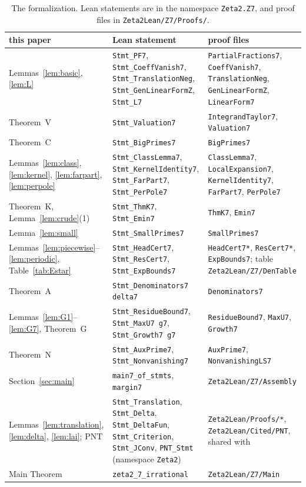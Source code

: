 \documentclass{amsart}
\theoremstyle{definition}
\theoremstyle{remark}
\numberwithin{equation}{section}
\begin{document}
\begin{table}[ht]
\centering
\footnotesize
\setlength{\tabcolsep}{3pt}
\renewcommand{\arraystretch}{1.2}
\caption{The formalization. Lean statements are in the namespace
\texttt{Zeta2.Z7}, and proof files in \texttt{Zeta2Lean/Z7/Proofs/}.}\label{tab:formal}
\begin{tabular}{P{2.9cm}P{4.4cm}P{4.3cm}}
\hline
this paper & Lean statement & proof files\\
\hline
Lemmas~\ref{lem:basic}, \ref{lem:L} & \texttt{Stmt\_PF7}, \texttt{Stmt\_CoeffVanish7},
  \texttt{Stmt\_TranslationNeg}, \texttt{Stmt\_GenLinearFormZ}, \texttt{Stmt\_L7}
 & \texttt{PartialFractions7}, \texttt{CoeffVanish7}, \texttt{TranslationNeg},
   \texttt{GenLinearFormZ}, \texttt{LinearForm7}\\
Theorem~V & \texttt{Stmt\_Valuation7} & \texttt{IntegrandTaylor7}, \texttt{Valuation7}\\
Theorem~C & \texttt{Stmt\_BigPrimes7} & \texttt{BigPrimes7}\\
Lemmas~\ref{lem:class}, \ref{lem:kernel}, \ref{lem:farpart}, \ref{lem:perpole}
 & \texttt{Stmt\_ClassLemma7}, \texttt{Stmt\_KernelIdentity7},
   \texttt{Stmt\_FarPart7}, \texttt{Stmt\_PerPole7}
 & \texttt{ClassLemma7}, \texttt{LocalExpansion7}, \texttt{KernelIdentity7},
   \texttt{FarPart7}, \texttt{PerPole7}\\
Theorem~K, Lemma~\ref{lem:crude}(1) & \texttt{Stmt\_ThmK7}, \texttt{Stmt\_Emin7}
 & \texttt{ThmK7}, \texttt{Emin7}\\
Lemma~\ref{lem:small} & \texttt{Stmt\_SmallPrimes7} & \texttt{SmallPrimes7}\\
Lemmas~\ref{lem:piecewise}--\ref{lem:periodic}, Table~\ref{tab:Estar}
 & \texttt{Stmt\_HeadCert7}, \texttt{Stmt\_ResCert7}, \texttt{Stmt\_ExpBounds7}
 & \texttt{HeadCert7*}, \texttt{ResCert7*}, \texttt{ExpBounds7};
   table \texttt{Zeta2Lean/Z7/DenTable}\\
Theorem~A & \texttt{Stmt\_Denominators7 delta7} & \texttt{Denominators7}\\
Lemmas~\ref{lem:G1}--\ref{lem:G7}, Theorem~G
 & \texttt{Stmt\_ResidueBound7}, \texttt{Stmt\_MaxU7 g7}, \texttt{Stmt\_Growth7 g7}
 & \texttt{ResidueBound7}, \texttt{MaxU7}, \texttt{Growth7}\\
Theorem~N & \texttt{Stmt\_AuxPrime7}, \texttt{Stmt\_Nonvanishing7}
 & \texttt{AuxPrime7}, \texttt{NonvanishingLS7}\\
Section~\ref{sec:main} & \texttt{main7\_of\_stmts}, \texttt{margin7}
 & \texttt{Zeta2Lean/Z7/Assembly}\\
Lemmas~\ref{lem:translation}, \ref{lem:delta}, \ref{lem:lai}; PNT
 & \texttt{Stmt\_Translation}, \texttt{Stmt\_Delta}, \texttt{Stmt\_DeltaFun},
   \texttt{Stmt\_Criterion}, \texttt{Stmt\_JConv}, \texttt{PNT\_Stmt} (namespace \texttt{Zeta2})
 & \texttt{Zeta2Lean/Proofs/*}, \texttt{Zeta2Lean/Cited/PNT}, shared with \cite{DevPair26}\\
Main Theorem & \texttt{zeta2\_7\_irrational} & \texttt{Zeta2Lean/Z7/Main}\\
\hline
\end{tabular}
\end{table}
\end{document}
